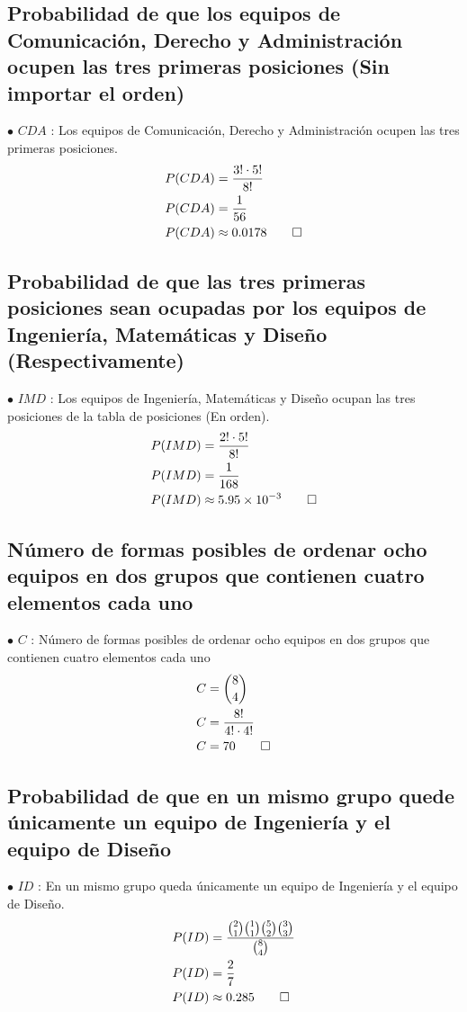 \documentclass[paper=letterpaper]{article}
\begin{document}
\subsection{Probabilidad de que los equipos de Comunicación, Derecho y Administración ocupen las tres primeras posiciones (Sin importar el orden)}
$\bullet$ $CDA$ : Los equipos de Comunicación, Derecho y Administración ocupen las tres primeras posiciones. 
\\
\begin{alignat*}{2}
P(CDA) &= \frac{3! \cdot 5!}{8!} \\
P(CDA) &= \frac{1}{56} \\
P(CDA) &\approx 0.0178 \qed
\end{alignat*}

\subsection{Probabilidad de que las tres primeras posiciones sean ocupadas por los equipos de Ingeniería, Matemáticas y Diseño (Respectivamente)}
$\bullet$ $IMD$ : Los equipos de Ingeniería, Matemáticas y Diseño ocupan las tres posiciones de la tabla de posiciones (En orden).
\\
\begin{alignat*}{2}
P(IMD) &= \frac{2! \cdot 5!}{8!} \\
P(IMD) &= \frac{1}{168} \\
P(IMD) &\approx \num{5.95e-3} \qed
\end{alignat*}

\subsection{Número de formas posibles de ordenar ocho equipos en dos grupos que contienen cuatro elementos cada uno}
$\bullet$ $C$ :  Número de formas posibles de ordenar ocho equipos en dos grupos que contienen cuatro elementos cada uno
\\
\begin{alignat*}{2}
C &= \binom{8}{4} \\
C &= \frac{8!}{4! \cdot 4!} \\
C &= 70 \qed
\end{alignat*}

\subsection{Probabilidad de que en un mismo grupo quede únicamente un equipo de Ingeniería y el equipo de Diseño}
$\bullet$ $ID$ : En un mismo grupo queda únicamente un equipo de Ingeniería y el equipo de Diseño.
\\
\begin{alignat*}{2}
P(ID) &= \frac{\binom{2}{1} \binom{1}{1} \binom{5}{2} \binom{3}{3}}{\binom{8}{4}} \\
P(ID) &= \frac{2}{7} \\
P(ID) &\approx 0.285 \qed 
\end{alignat*}
\end{document}
